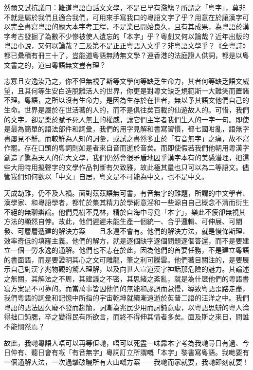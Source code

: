 \documentclass[a5paper, 12pt, openany]{book} %
\begin{document}
然爾又試抗議曰：難道粵語白話文文學，不是已早有濫觴？所謂之「粵字」，莫非不就是屬於我們且適合我們，可用來手寫我口的粵語文字了乎？用意在於讓漢字可以完全書寫粵語的龐大本字考工程，不是業已開始良久，且有其成果，為粵語於漢字考古發掘了為數不少慘被使人遺忘的「本字」乎？粵劇又何以論哉？近年出版的粵語小說，又何以論哉？三及第不是正正粵語入文乎？非粵語文學乎？《全粵詩》都已纍積有冊三十了，豈能道粵語無詩無文學？連香港的法庭證人供詞，都是以粵文書之的，道曰粵語無文豈有理？

志寡且安逸汝乃之，你不但無視了斯等文學何等缺乏生命力，其者何等缺乏語文威望，且其何等生安白造脫離活人的世界，你更是對粵文缺乏規範斯一大難笑而置諸不理。粵語，之所以沒有生命力，是因為生存於在世者，無以予其語文他們自己的生命。世界是屬於在世活著的人的，而不是俱往矣百載的仙遊故人的。可惜，我們的文字，卻是樂於賦予死人無上的權威，讓它們主宰者我們生人的一字一句。即使是最為簡單的語法部件和詞彙，我們的用字見解和書寫習慣，都七國咁亂，語無字書屢見不鮮。而較鮮為人知的詞彙，或試之書然多止於「有音無字」之痛，故不寫作罷。存在口頭的粵詞則如是者來自音而逝於音矣。而即使假若我們他朝用粵漢字創造了驚為天人的偉大文學，我們仍然會很矛盾地因乎漢字本有的美感潛理，把這些大用特用擬聲字的文學作品判斷有欠致雅，故此極其量也只可以為二等語文。儘管我們如何欲以「中文」自居，粵文是不可能為中文，也不是中文。

天成劫難，仍不及人禍。面對茲茲語無可書，有音無字的難題，所謂的中文學者、漢學家、和粵語學者，都忙於集其精力於學術意淫和一些源自自己概念不清而衍生不絕的無聊辯論。他們見樹不見林，精於自海中尋覓「本字」，樂此不疲卻無視其方法的顯然自悖。故此，他們遲遲未能生產一個統一、合乎邏輯、可伸展、可闡發、可層層遞建的解決方案——且永遠不會有。他們的解決方法，就是慢條斯理、效率奇低的填窿主義。他們的解方，就是逐個缺字逐個問題逐個答還，而不是要建立一個一勞永逸的通解。他們也不志在於此，因為他們的首要任務，不是建立粵語的書面語，而是要證明其心之文可雕龍，筆之利可騰雲。他們著目關注的，是要展示自己對漢字兆物觀的驚人理解，以及向世人宣道漢字神話那危險的魅力。其論述之無關，其解法之不周，其建議之不密，其思緒之紊亂，就是為什麽他們的粵語書寫方案是不可靠的。而當萬事皆因他們的無能和謬誤而怠慢，導致粵語歪路走盡，我們粵語的詞彙和記憶中所指的宇宙乾坤就續漸遠逝於英普二語的汪洋之中。我們粵語的語法因久廢不發而趨簡，詞漸為兆民少用而詞鈍意虛，以粵語思辯的粵人淪得拙口鈍腮，卒之變得民有所欲言，而終不得伸其情者多矣。面及斯之來日，問誰不能憫然焉？

故此，我哋粵語人唔可以再等佢哋，唔可以死盡一味靠本字考為我哋尋日有過、今日仲有、聽日會有嘅「有音無字」粵詞訂立所謂嘅「本字」黎書寫粵語。我哋要有一個通解大法，一次過擊破曬所有大山嘅方案——我哋而家就要，我哋即刻就要！
\end{document}
